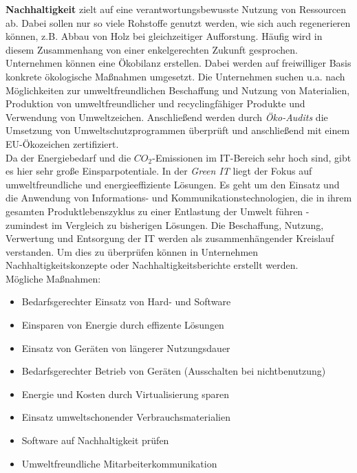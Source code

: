 \documentclass[a4paper, 12pt]{report}
\begin{document}
\begin{multicols}{2}
\textbf{Nachhaltigkeit} zielt auf eine verantwortungsbewusste Nutzung von
Ressourcen ab. Dabei sollen nur so viele Rohstoffe genutzt werden, wie sich auch
regenerieren können, z.B. Abbau von Holz bei gleichzeitiger Aufforstung. Häufig
wird in diesem Zusammenhang von einer enkelgerechten Zukunft gesprochen. \\

Unternehmen können eine Ökobilanz erstellen. Dabei werden auf freiwilliger Basis
konkrete ökologische Maßnahmen umgesetzt. Die Unternehmen suchen u.a. nach
Möglichkeiten zur umweltfreundlichen Beschaffung und Nutzung von Materialien,
Produktion von umweltfreundlicher und recyclingfähiger Produkte und Verwendung
von Umweltzeichen. Anschließend werden durch \emph{Öko-Audits} die Umsetzung von
Umweltschutzprogrammen überprüft und anschließend mit einem EU-Ökozeichen
zertifiziert. \\

Da der Energiebedarf und die $CO_2$-Emissionen im IT-Bereich sehr hoch sind,
gibt es hier sehr große Einsparpotentiale. In der \emph{Green IT} liegt der
Fokus auf umweltfreundliche und energieeffiziente Lösungen. Es geht um den
Einsatz und die Anwendung von Informations- und Kommunikationstechnologien, die
in ihrem gesamten Produktlebenszyklus zu einer Entlastung der Umwelt führen -
zumindest im Vergleich zu bisherigen Lösungen. Die Beschaffung, Nutzung,
Verwertung und Entsorgung der IT werden als zusammenhängender Kreislauf
verstanden. Um dies zu überprüfen können in Unternehmen Nachhaltigkeitskonzepte
oder Nachhaltigkeitsberichte erstellt werden. \\

Mögliche Maßnahmen:

\begin{itemize}
    \item Bedarfsgerechter Einsatz von Hard- und Software
    \item Einsparen von Energie durch effizente Lösungen
    \item Einsatz von Geräten von längerer Nutzungsdauer
    \item Bedarfsgerechter Betrieb von Geräten (Ausschalten bei nichtbenutzung)
    \item Energie und Kosten durch Virtualisierung sparen
    \item Einsatz umweltschonender Verbrauchsmaterialien
    \item Software auf Nachhaltigkeit prüfen
    \item Umweltfreundliche Mitarbeiterkommunikation
\end{itemize}


\end{multicols}
\end{document}
